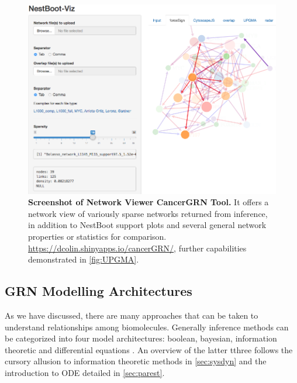 \begin{figure}
\centering
\includegraphics[width=1\linewidth]{4/NestBoot-Viz2.png}
\caption{\textbf{Screenshot of Network Viewer CancerGRN Tool.} It offers a network view of variously sparse networks returned from inference, in addition to NestBoot support plots and several general network properties or statistics for comparison. \url{https://dcolin.shinyapps.io/cancerGRN/}, further capabilities demonstrated in \cref{fig:UPGMA}.}
\label{fig:GSweb}
\end{figure}

\subsection{GRN Modelling Architectures}
\label{sec:models}
As we have discussed, there are many approaches that can be taken to understand relationships among biomolecules. Generally inference methods can be categorized into four model architectures: boolean, bayesian, information theoretic and differential equations \citep{HECKER200986,xiong2012gene,yaghoobi2012review}. An overview of the latter tthree follows the cursory allusion to information theoretic methods in \cref{sec:sysdyn} and the introduction to ODE detailed in \cref{sec:parest}.

